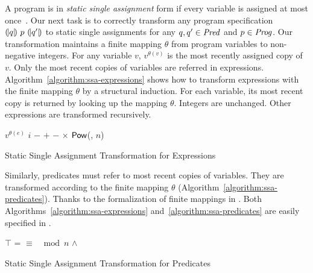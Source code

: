 
A program is in \emph{static single assignment} form if every variable
is assigned at most once~\cite{AWZ:88:DQVP}.
Our next task is to correctly transform any
program specification ${(\!|}{q}{|\!)}~{p}~{(\!|}{q'}{|\!)}$ to static single 
assignments for any $q, q' \in \mathit{Pred}$ and $p \in \mathit{Prog}$. Our transformation
maintains a finite mapping $\theta$ from program variables to
non-negative integers. For any variable $v$, $v^{\theta(v)}$ is
the most recently assigned copy of $v$. Only the most recent copies of
variables are referred in
expressions. Algorithm~\ref{algorithm:ssa-expressions} shows how 
to transform expressions with the finite mapping $\theta$ by a
structural induction. For each variable, its most recent copy is
returned by looking up the mapping $\theta$. Integers are
unchanged. Other expressions are transformed recursively.

\begin{algorithm}
  \begin{algorithmic}[1]
       \Return $v^{\theta(e)}$ \EndCase
       \Return $i$ \EndCase
       \Return $-$ \EndCase
        \Return {} $+$ 
      \EndCase
        \Return {} $-$ 
      \EndCase
        \Return {} $\times$ 
      \EndCase
        \Return $\mbox{\textsf{Pow}}$(, $n$)
      \EndCase
    \EndMatch
    \EndFunction
  \end{algorithmic}
  \caption{Static Single Assignment Transformation for Expressions}
  \label{algorithm:ssa-expressions}
\end{algorithm}

Similarly, predicates must refer to most recent copies of 
variables. They are transformed according to the finite mapping
$\theta$ (Algorithm~\ref{algorithm:ssa-predicates}). Thanks to the
formalization of finite mappings in \coq. Both
Algorithms~\ref{algorithm:ssa-expressions}
and~\ref{algorithm:ssa-predicates} are easily specified in \gallina.

\begin{algorithm}
  \begin{algorithmic}[1]
      \Case{$\top$} \Return $\top$ \EndCase
        \Return {} = 
      \EndCase
        \Return {} $\equiv$ 
                 $\mod n$
      \EndCase
        \Return {} $\wedge$
      \EndCase
    \EndMatch
    \EndFunction
  \end{algorithmic}
  \caption{Static Single Assignment Transformation for Predicates}
  \label{algorithm:ssa-predicates}
\end{algorithm}

